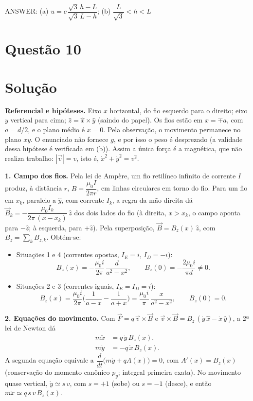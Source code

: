 \documentclass{article}%
\begin{document}
ANSWER: (a) $u=c\,\dfrac{\sqrt{3}\,h-L}{\sqrt{3}\,L-h}$; (b) $\dfrac{L}{\sqrt{3}}<h<L$%
\newpage%
\section*{Questão 10}

\section*{Solução}

\textbf{Referencial e hipóteses.} Eixo $x$ horizontal, do fio esquerdo para o direito; eixo $y$ vertical para cima; $\hat z=\hat x\times\hat y$ (saindo do papel). Os fios estão em $x=\mp a$, com $a=d/2$, e o plano médio é $x=0$. Pela observação, o movimento permanece no plano $xy$. O enunciado não fornece $g$, e por isso o peso é desprezado (a validade dessa hipótese é verificada em (b)). Assim a única força é a magnética, que não realiza trabalho: $|\vec v|=v$, isto é, $\dot x^2+\dot y^2=v^2$.

\textbf{1. Campo dos fios.} Pela lei de Ampère, um fio retilíneo infinito de corrente $I$ produz, à distância $r$, $B=\dfrac{\mu_0 I}{2\pi r}$, em linhas circulares em torno do fio. Para um fio em $x_k$, paralelo a $\hat y$, com corrente $I_k$, a regra da mão direita dá $\vec B_k=-\dfrac{\mu_0 I_k}{2\pi\,(x-x_k)}\,\hat z$ dos dois lados do fio (à direita, $x>x_k$, o campo aponta para $-\hat z$; à esquerda, para $+\hat z$). Pela superposição, $\vec B=B_z(x)\,\hat z$, com $B_z=\sum_k B_{z,k}$. Obtém-se:
\begin{itemize}
\item Situações 1 e 4 (correntes opostas, $I_E=i$, $I_D=-i$):
\[
B_z(x)=-\frac{\mu_0 i}{2\pi}\,\frac{d}{a^2-x^2},\qquad B_z(0)=-\frac{2\mu_0 i}{\pi d}\neq 0 .
\]
\item Situações 2 e 3 (correntes iguais, $I_E=I_D=i$):
\[
B_z(x)=\frac{\mu_0 i}{2\pi}\Big(\frac{1}{a-x}-\frac{1}{a+x}\Big)=\frac{\mu_0 i}{\pi}\,\frac{x}{a^2-x^2},\qquad B_z(0)=0 .
\]
\end{itemize}

\textbf{2. Equações do movimento.} Com $\vec F=q\,\vec v\times\vec B$ e $\vec v\times\vec B=B_z\,(\dot y\,\hat x-\dot x\,\hat y)$, a 2ª lei de Newton dá
\begin{align*}
m\ddot x&=q\,\dot y\,B_z(x),\\
m\ddot y&=-q\,\dot x\,B_z(x).
\end{align*}
A segunda equação equivale a $\dfrac{d}{dt}\big(m\dot y+qA(x)\big)=0$, com $A'(x)=B_z(x)$ (conservação do momento canônico $p_y$; integral primeira exata). No movimento quase vertical, $\dot y\simeq s\,v$, com $s=+1$ (sobe) ou $s=-1$ (desce), e então $m\ddot x\simeq q\,s\,v\,B_z(x)$.
\end{document}

